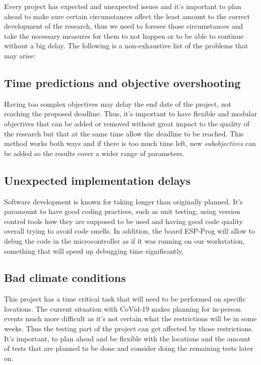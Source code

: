 Every project has expected and unexpected issues and it's important to plan ahead to make sure certain circumstances affect the least amount to the correct development of the research, thus we need to foresee those circumstances and take the necessary measures for them to not happen or to be able to continue without a big delay. The following is a non-exhaustive list of the problems that may arise:
\subsection{Time predictions and objective overshooting}
Having too complex objectives may delay the end date of the project, not reaching the proposed deadline. Thus, it's important to have flexible and modular objectives that can be added or removed without great impact to the quality of the research but that at the same time allow the deadline to be reached. This method works both ways and if there is too much time left, new \textit{subobjectives} can be added so the results cover a wider range of parameters.

\subsection{Unexpected implementation delays}
Software development is known for taking longer than originally planned. It's paramount to have good coding practices, such as unit testing, using version control tools how they are supposed to be used and having good code quality overall trying to avoid code smells. In addition, the board ESP-Prog will allow to debug the code in the microcontroller as if it was running on our workstation, something that will speed up debugging time significantly.

\subsection{Bad climate conditions}
This project has a time critical task that will need to be performed on specific locations. 
The current situation with CoVid-19 makes planning for in-person events much more difficult as it's not certain what the restrictions will be in some weeks. Thus the testing part of the project can get affected by those restrictions. It's important, to plan ahead and be flexible with the locations and the amount of tests that are planned to be done and consider doing the remaining tests later on.
